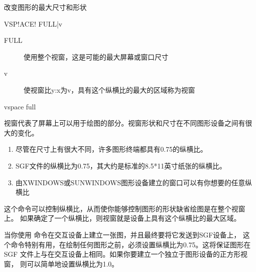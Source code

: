 \label{cmd:vspace}

改变图形的最大尺寸和形状

\begin{SACSTX}
VSP!ACE! FULL|v
\end{SACSTX}

\begin{description}
\item [FULL] 使用整个视窗，这是可能的最大屏幕或窗口尺寸
\item [v] 使视窗比y:x为v，具有这个纵横比的最大的区域称为视窗
\end{description}

\begin{SACDFT}
vspace full
\end{SACDFT}

视窗代表了屏幕上可以用于绘图的部分。视窗形状和尺寸在不同图形设备之间有很大的变化。
\begin{enumerate}
\item 尽管在尺寸上有很大不同，许多图形终端都具有0.75的纵横比。
\item SGF文件的纵横比为0.75，其大约是标准的8.5*11英寸纸张的纵横比。
\item  由XWINDOWS或SUNWINDOWS图形设备建立的窗口可以有你想要的任意纵横比
\end{enumerate}

这个命令可以控制纵横比，从而使你能够控制图形的形状缺省绘图是在整个视窗上。
如果确定了一个纵横比，则视窗就是设备上具有这个纵横比的最大区域。

当你使用  命令在交互设备上建立一张图，并且最终要将它发送到SGF设备上，
这个命令特别有用，在绘制任何图形之前，必须设置纵横比为0.75。这将保证图形在SGF
文件上与在交互设备上相同。如果你要建立一个独立于图形设备的正方形视窗，
则可以简单地设置纵横比为1.0。
